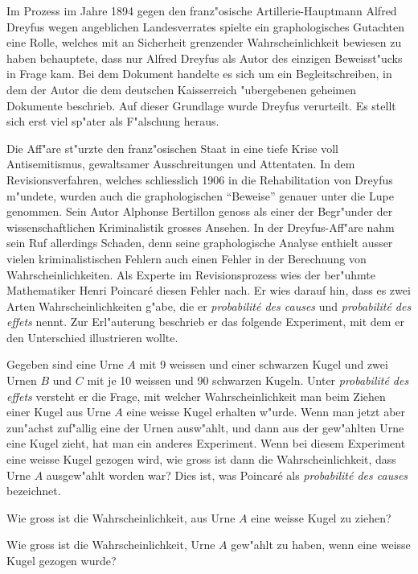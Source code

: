 Im Prozess im Jahre 1894 gegen den franz"osische Artillerie-Hauptmann
Alfred Dreyfus wegen
angeblichen Landesverrates spielte ein graphologisches Gutachten eine
Rolle, welches mit an Sicherheit grenzender Wahrscheinlichkeit bewiesen
zu haben behauptete, dass nur Alfred Dreyfus als Autor des einzigen
Beweisst"ucks in Frage kam.
Bei dem Dokument handelte es sich um ein Begleitschreiben, in dem der
Autor die dem deutschen Kaisserreich "ubergebenen geheimen Dokumente
beschrieb.
Auf dieser Grundlage wurde Dreyfus verurteilt.
Es stellt sich erst viel sp"ater als F"alschung heraus.

Die Aff"are st"urzte den franz"osischen Staat in eine tiefe Krise
voll Antisemitismus, gewaltsamer Ausschreitungen und Attentaten.
In dem Revisionsverfahren, welches schliesslich 1906 in die Rehabilitation
von Dreyfus m"undete, wurden auch die graphologischen ``Beweise''
genauer unter die Lupe genommen.
Sein Autor Alphonse Bertillon genoss als einer der Begr"under
der wissenschaftlichen
Kriminalistik grosses Ansehen. In der Dreyfus-Aff"are nahm sein Ruf
allerdings Schaden, denn seine graphologische Analyse enthielt
ausser vielen kriminalistischen Fehlern auch einen Fehler in der
Berechnung von Wahrscheinlichkeiten.
Als Experte im Revisionsprozess wies der ber"uhmte Mathematiker
Henri Poincar\'e diesen Fehler nach.
Er wies darauf hin, dass es zwei Arten Wahrscheinlichkeiten g"abe,
die er {\it probabilit\'e des causes} und {\it probabilit\'e des effets}
nennt.
Zur Erl"auterung beschrieb er das folgende Experiment, mit
dem er den Unterschied illustrieren wollte. 

Gegeben sind eine Urne $A$ mit 9 weissen und einer schwarzen Kugel
und zwei Urnen $B$ und $C$ mit je 10 weissen und 90 schwarzen Kugeln.
Unter {\it probabilit\'e des effets} versteht er die Frage, mit welcher
Wahrscheinlichkeit man beim Ziehen einer Kugel aus Urne $A$ eine
weisse Kugel erhalten w"urde.
Wenn man jetzt aber zun"achst zuf"allig eine der Urnen ausw"ahlt, und dann
aus der gew"ahlten Urne eine Kugel zieht, hat man ein anderes
Experiment. 
Wenn bei diesem Experiment eine weisse Kugel gezogen wird, wie gross
ist dann die Wahrscheinlichkeit, dass Urne $A$ ausgew"ahlt worden war?
Dies ist, was Poincar\'e als {\it probabilit\'e des causes} bezeichnet.

\begin{teilaufgaben}
\item Wie gross ist die Wahrscheinlichkeit, aus Urne $A$ eine weisse Kugel
zu ziehen?
\item Wie gross ist die Wahrscheinlichkeit, Urne $A$ gew"ahlt zu haben,
wenn eine weisse Kugel gezogen wurde?
\end{teilaufgaben}


